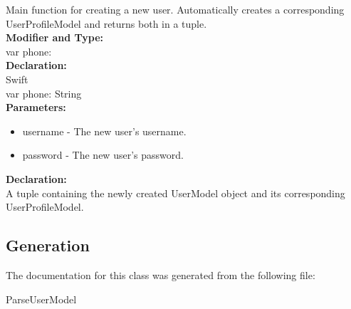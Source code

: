 Main function for creating a new user. Automatically creates a corresponding UserProfileModel and returns both in a tuple.\\

\textbf{Modifier and Type:}\\
\tab var phone:\\


\textbf{Declaration:}\\
\tab 
Swift\\

var phone: String\\

\textbf{Parameters:}
\begin{itemize}
\item username - The new user’s username.
\item password - The new user’s password.
\end{itemize}

\textbf{Declaration:}\\
A tuple containing the newly created UserModel object and its corresponding UserProfileModel.\\


\subsection{Generation}
The documentation for this class was generated from the following file\-:
\begin{DoxyCompactItemize}
\item ParseUserModel
\end{DoxyCompactItemize} 










